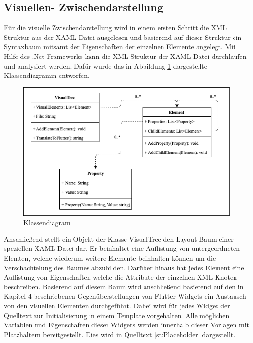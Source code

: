 \subsection{Visuellen- Zwischendarstellung}

Für die visuelle Zwischendarstellung wird in einem ersten Schritt die XML Struktur aus der XAML Datei ausgelesen und basierend auf dieser Struktur ein Syntaxbaum mitsamt der Eigenschaften der einzelnen Elemente angelegt.  Mit Hilfe des .Net Frameworks kann die XML Struktur der XAML-Datei durchlaufen und analysiert werden.  Dafür wurde das in Abbildung \ref{fig:Klassendiagram} dargestellte Klassendiagramm entworfen. 
\newpage

\begin{figure}[!ht]
 \includegraphics[width=\textwidth,keepaspectratio]{Images/Implementation/Klassendiagram.png}
 \caption{Klassendiagram}
 \label{fig:Klassendiagram}
\end{figure}

Anschließend stellt ein Objekt der Klasse VisualTree den Layout-Baum einer speziellen XAML Datei dar.  Er beinhaltet eine Auflistung von untergeordneten Elemten, welche wiederum weitere Elemente beinhalten können um die Verschachtelung des Baumes abzubilden. Darüber hinaus hat jedes Element eine Auflistung von Eigenschaften welche die Attribute der einzelnen XML Knoten beschreiben.  Basierend auf diesem Baum wird anschließend basierend auf den in Kapitel 4 beschriebenen Gegenüberstellungen von Flutter Widgets ein Austausch von den visuellen Elementen durchgeführt.  Dabei wird für jedes Widget der Quelltext zur Initialisierung in einem Template vorgehalten.  Alle möglichen Variablen und Eigenschaften dieser Widgets werden innerhalb dieser Vorlagen mit Platzhaltern bereitgestellt.  Dies wird in Quelltext \ref{st:Placeholder} dargestellt.

